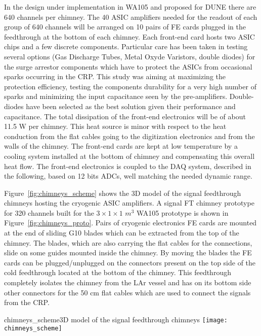 In the design under implementation in WA105 and proposed for DUNE there are 640 channels per chimney. The 40 ASIC amplifiers needed for the readout of each group of 640 channels will be arranged on 10 pairs of FE cards plugged in the feedthrough at the bottom of each chimney.  Each front-end card hosts two ASIC chips and a few discrete components. Particular care has been taken in testing several options (Gas Discharge Tubes, Metal Oxyde Varistors, double diodes) for the surge arrestor components which have to protect the ASICs from occasional sparks occurring in the CRP.  This study was aiming at maximizing the protection efficiency, testing the components durability for a very high number of sparks and minimizing the input capacitance seen by the pre-amplifiers. Double-diodes have been selected as the best solution given their performance and capacitance. The total dissipation of the front-end electronics will be of about 11.5 W per chimney. This heat source is minor with respect to the heat conduction from the flat cables going to the digitization electronics and from the walls of the chimney. The front-end cards are kept at low temperature by a cooling system installed at the bottom of chimney and compensating this overall heat flow. The front-end electronics is coupled to the DAQ system, described in the following, based on 12 bits ADCs, well matching the needed dynamic range.

Figure~\ref{fig:chimneys_scheme} shows the 3D model of the signal feedthrough chimneys hosting the cryogenic ASIC amplifiers. A signal FT chimney prototype for 320 channels built for the $3\times 1\times 1$ $m^3$ WA105 prototype is shown in Figure~\ref{fig:chimneys_proto}. Pairs of cryogenic electronics FE cards are mounted at the end of sliding G10 blades which can be extracted from the top of the chimney. The blades, which are also carrying the flat cables for the connections, slide on some guides mounted inside the chimney. By moving the blades the FE cards can be plugged/unplugged on the connectors present on the top side of the cold feedthrough located at the bottom of the chimney. This feedthrough completely isolates the chimney from the LAr vessel and has on its bottom side other connectors for the 50 cm flat cables which are used to connect the signals from the CRP.   

\begin{cdrfigure}{chimneys_scheme}{3D model of the signal feedthrough chimneys}
\texttt{[image: chimneys\_scheme]}
\end{cdrfigure}

